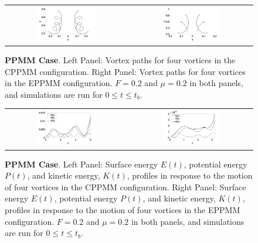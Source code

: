 \documentclass[a4paper,11pt]{article}
\begin{document}
%
\begin{figure}[!h]
\centering
\begin{tabular}{cc}
\includegraphics[width=0.5\textwidth]{tracks_F_pt2_tf_6_ppmm} & 
\includegraphics[width=0.5\textwidth]{tracks_F_pt2_tf_3pt2_ppmm_sym}
\end{tabular}
\caption{\small {\bf PPMM Case}. Left Panel: Vortex paths for four vortices in the CPPMM configuration. Right Panel: Vortex paths for four vortices in the EPPMM configuration. $F=0.2$ and $\mu=0.2$ in both panels, and simulations are run for $0\leq t \leq t_{b}$.}
\label{fig:tracksppmm}
\end{figure}
%
\begin{figure}[!h]
\centering
\begin{tabular}{cc}
\includegraphics[width=0.5\textwidth]{energy_profile_mu_pt2_F_pt2_ppmm} &
\includegraphics[width=0.5\textwidth]{energy_profile_mu_pt2_F_pt2_ppmm_sym}
\end{tabular}
\caption{\small {\bf PPMM Case}.  Left Panel: Surface energy $E(t)$, potential energy $P(t)$, and kinetic energy, $K(t)$, profiles in response to the motion of four vortices in the CPPMM configuration. Right Panel: Surface energy $E(t)$, potential energy $P(t)$, and kinetic energy, $K(t)$, profiles in response to the motion of four vortices in the EPPMM configuration.  $F=0.2$ and $\mu=0.2$ in both panels, and simulations are run for $0\leq t \leq t_{b}$.}
\label{fig:eprof_ppmm}
\end{figure}
\end{document}
